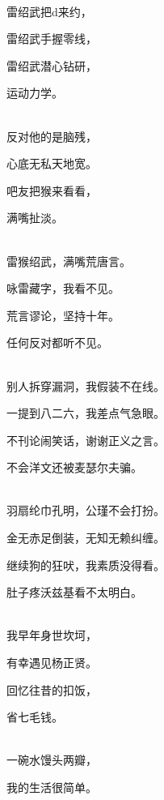 \documentclass[UTF8,12pt,oneside]{ctexbook}
\begin{document}
        \begin{center}
            ~\\
            雷绍武把d来约，
            
            雷绍武手握零线，
            
            雷绍武潜心钻研，
            
            运动力学。
            
            ~\\
            反对他的是脑残，
            
            心底无私天地宽。
            
            吧友把猴来看看，
            
            满嘴扯淡。
            
            ~\\
            雷猴绍武，满嘴荒唐言。
            
            咏雷藏字，我看不见。
            
            荒言谬论，坚持十年。
            
            任何反对都听不见。
            
            ~\\
            别人拆穿漏洞，我假装不在线。
            
            一提到八二六，我差点气急眼。
            
            不刊论闹笑话，谢谢正义之言。
            
            不会洋文还被麦瑟尔夫骗。
            
            ~\\
            羽扇纶巾孔明，公瑾不会打扮。
            
            金无赤足倒装，无知无赖纠缠。
            
            继续狗的狂吠，我素质没得看。
            
            肚子疼沃兹基看不太明白。
            
            ~\\
            我早年身世坎坷，
            
            有幸遇见杨正贤。
            
            回忆往昔的扣饭，
            
            省七毛钱。
            
            ~\\
            一碗水馒头两瓣，
            
            我的生活很简单。
            

\end{center}
\end{document}
